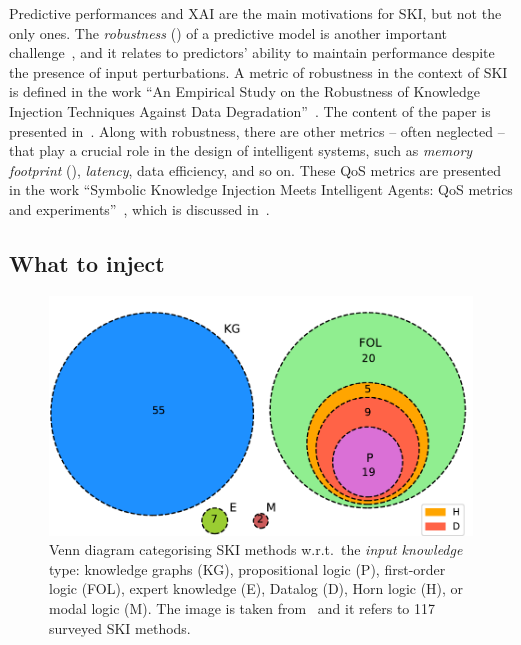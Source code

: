 Predictive performances and \gls{XAI} are the main motivations for \gls{SKI}, but not the only ones.
%
The \emph{robustness} () of a predictive model is another important challenge~\cite{DBLP:conf/eccv/LiuCZH18}, and it relates to predictors' ability to maintain performance despite the presence of input perturbations.
%
A metric of robustness in the context of \gls{SKI} is defined in the work ``An Empirical Study on the Robustness of Knowledge Injection Techniques Against Data Degradation''~\cite{DBLP:conf/woa/RafanelliMACO24}.
%
The content of the paper is presented in~.
%
Along with robustness, there are other metrics -- often neglected -- that play a crucial role in the design of intelligent systems, such as \emph{memory footprint} (), \emph{latency}, data efficiency, and so on.
%
These \gls{QoS} metrics are presented in the work ``Symbolic Knowledge Injection Meets Intelligent Agents: QoS metrics and experiments''~\cite{DBLP:journals/aamas/AgiolloRMCO23}, which is discussed in~.


\subsection{What to inject}\label{subsec:what-to-inject}
%
\begin{figure}
    \centering
    \includegraphics[width=.4\linewidth]{figures/ski-logic}
    \caption[Venn diagram categorising SKI methods]{
        Venn diagram categorising SKI methods w.r.t.\ the \emph{input knowledge} type: knowledge graphs (KG), propositional logic (P), first-order logic (FOL), expert knowledge (E), Datalog (D), Horn logic (H), or modal logic (M).
        The image is taken from~\cite{DBLP:journals/csur/CiattoSAMO24} and it refers to 117 surveyed \gls{SKI} methods.
    }
    \label{fig:pie-ski-logic}
\end{figure}


